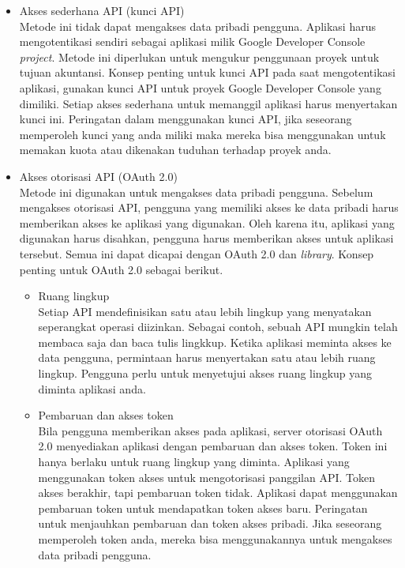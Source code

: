 \begin{itemize}
\item Akses sederhana API (kunci API)\\
Metode ini tidak dapat mengakses data pribadi pengguna. Aplikasi harus mengotentikasi sendiri sebagai aplikasi milik Google Developer Console {\it project}. Metode ini diperlukan untuk mengukur penggunaan proyek untuk tujuan akuntansi.
Konsep penting untuk kunci API pada saat mengotentikasi aplikasi, gunakan kunci API untuk proyek Google Developer Console yang dimiliki. Setiap akses sederhana untuk memanggil aplikasi harus menyertakan kunci ini. Peringatan dalam menggunakan kunci API, jika seseorang memperoleh kunci yang anda miliki maka mereka bisa menggunakan untuk memakan kuota atau dikenakan tuduhan terhadap proyek anda.

\item Akses otorisasi API (OAuth 2.0)\\
Metode ini digunakan untuk mengakses data pribadi pengguna. Sebelum mengakses otorisasi API, pengguna yang memiliki akses ke data pribadi harus memberikan akses ke aplikasi yang digunakan. Oleh karena itu, aplikasi yang digunakan harus disahkan, pengguna harus memberikan akses untuk aplikasi tersebut. Semua ini dapat dicapai dengan OAuth 2.0 dan {\it library}.
Konsep penting untuk OAuth 2.0 sebagai berikut.
\begin{itemize}
\item Ruang lingkup\\
Setiap API mendefinisikan satu atau lebih lingkup yang menyatakan seperangkat operasi diizinkan. Sebagai contoh, sebuah API mungkin telah membaca saja dan baca tulis lingkkup. Ketika aplikasi meminta akses ke data pengguna, permintaan harus menyertakan satu atau lebih ruang lingkup. Pengguna perlu untuk menyetujui akses ruang lingkup yang diminta aplikasi anda.

\item Pembaruan dan akses token\\
Bila pengguna memberikan akses pada aplikasi, server otorisasi OAuth 2.0 menyediakan aplikasi dengan pembaruan dan akses token. Token ini hanya berlaku untuk ruang lingkup yang diminta. Aplikasi yang menggunakan token akses untuk mengotorisasi panggilan API. Token akses berakhir, tapi pembaruan token tidak. Aplikasi dapat menggunakan pembaruan token untuk mendapatkan token akses baru.
Peringatan untuk menjauhkan pembaruan dan token akses pribadi. Jika seseorang memperoleh token anda, mereka bisa menggunakannya untuk mengakses data pribadi pengguna.


\end{itemize}
\end{itemize}
